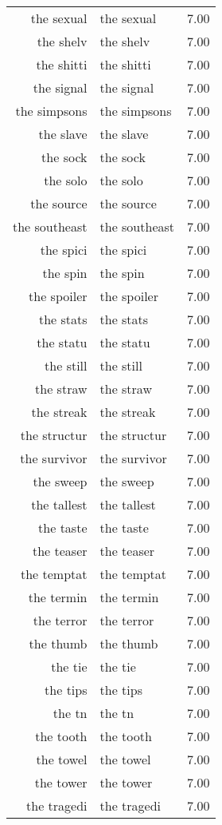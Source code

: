 \begin{table}[ht]
\begin{tabular}{rlr}
  the sexual & the sexual & 7.00 \\ 
  the shelv & the shelv & 7.00 \\ 
  the shitti & the shitti & 7.00 \\ 
  the signal & the signal & 7.00 \\ 
  the simpsons & the simpsons & 7.00 \\ 
  the slave & the slave & 7.00 \\ 
  the sock & the sock & 7.00 \\ 
  the solo & the solo & 7.00 \\ 
  the source & the source & 7.00 \\ 
  the southeast & the southeast & 7.00 \\ 
  the spici & the spici & 7.00 \\ 
  the spin & the spin & 7.00 \\ 
  the spoiler & the spoiler & 7.00 \\ 
  the stats & the stats & 7.00 \\ 
  the statu & the statu & 7.00 \\ 
  the still & the still & 7.00 \\ 
  the straw & the straw & 7.00 \\ 
  the streak & the streak & 7.00 \\ 
  the structur & the structur & 7.00 \\ 
  the survivor & the survivor & 7.00 \\ 
  the sweep & the sweep & 7.00 \\ 
  the tallest & the tallest & 7.00 \\ 
  the taste & the taste & 7.00 \\ 
  the teaser & the teaser & 7.00 \\ 
  the temptat & the temptat & 7.00 \\ 
  the termin & the termin & 7.00 \\ 
  the terror & the terror & 7.00 \\ 
  the thumb & the thumb & 7.00 \\ 
  the tie & the tie & 7.00 \\ 
  the tips & the tips & 7.00 \\ 
  the tn & the tn & 7.00 \\ 
  the tooth & the tooth & 7.00 \\ 
  the towel & the towel & 7.00 \\ 
  the tower & the tower & 7.00 \\ 
  the tragedi & the tragedi & 7.00 \\ 

\end{tabular}
\end{table}
